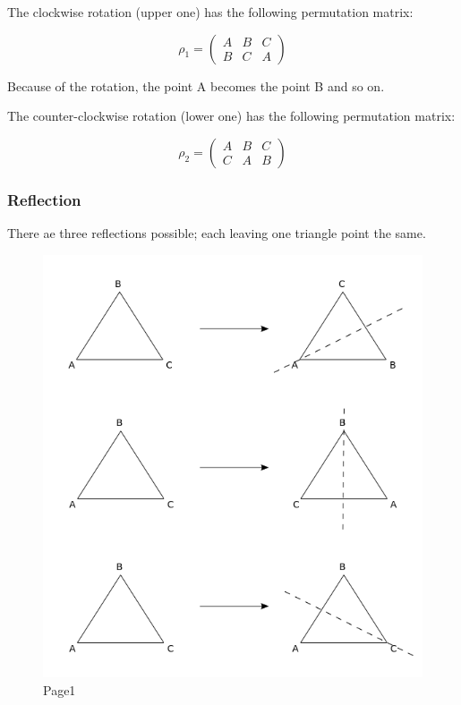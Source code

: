 The clockwise rotation (upper one) has the following permutation matrix:

\[
\rho_1=\begin{pmatrix}
A & B & C\\
B & C & A\end{pmatrix}
\]

Because of the rotation, the point A becomes the point B and so on.

The counter-clockwise rotation (lower one) has the following permutation
matrix:

\[
\rho_2=\begin{pmatrix}
A & B & C\\
C & A & B\end{pmatrix}
\]

\subsubsection{Reflection}\label{reflection}

There ae three reflections possible; each leaving one triangle point the
same.

\begin{figure}
\centering
\includegraphics[scale=0.7]{images/groups_02_3.png}
\caption{Page1}
\end{figure}

